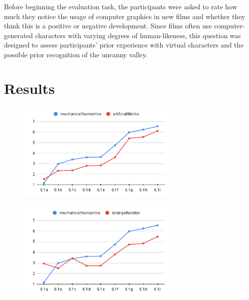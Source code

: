 Before beginning the evaluation task, the participants were asked to rate how much they notice the usage of computer graphics in new films and whether they think this is a positive or negative development. Since films often use computer-generated characters with varying degrees of human-likeness, this question was designed to assess participants' prior experience with virtual characters and the possible prior recognition of the uncanny valley.


\section{Results}

\begin{figure} %
    \centering
    \includegraphics[width=0.7\textwidth]{graphics/result/result1.png}
    \caption{}
    \label{fig:result1}
\end{figure}

\begin{figure} %
    \centering
    \includegraphics[width=0.7\textwidth]{graphics/result/result3.png}
    \caption{}
    \label{fig:result3}
\end{figure}


